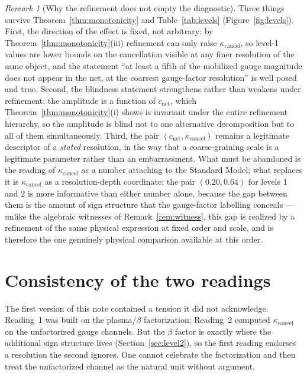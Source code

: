 \documentclass[11pt]{article}
\theoremstyle{definition}
\theoremstyle{remark}
\newtheorem{remark}[theorem]{Remark}
\newcommand{\net}{c_{\mathrm{net}}}
\newcommand{\kcancel}{\kappa_{\mathrm{cancel}}}
\begin{document}
\begin{remark}[Why the refinement does not empty the diagnostic]
\label{rem:survives}
Three things survive Theorem~\ref{thm:monotonicity} and Table~\ref{tab:levels}
(Figure~\ref{fig:levels}). First, the
direction of the effect is fixed, not arbitrary: by Theorem~\ref{thm:monotonicity}(iii) refinement
can only raise $\kcancel$, so level-1 values are lower bounds on the cancellation visible at any
finer resolution of the same object, and the statement ``at least a fifth of the mobilized gauge
magnitude does not appear in the net, at the coarsest gauge-factor resolution'' is well posed and
true. Second, the blindness statement strengthens rather than weakens under refinement: the
amplitude is a function of $\net$, which Theorem~\ref{thm:monotonicity}(i) shows is invariant under
the entire refinement hierarchy, so the amplitude is blind not to one alternative decomposition but
to all of them simultaneously. Third, the pair $(\net, \kcancel)$ remains a legitimate descriptor
of a \emph{stated} resolution, in the way that a coarse-graining scale is a legitimate parameter
rather than an embarrassment. What must be abandoned is the reading of $\kcancel$ as a number
attaching to the Standard Model; what replaces it is $\kcancel$ as a resolution-depth coordinate:
the pair $(0.20, 0.64)$ for levels 1 and 2 is more informative than either number alone, because the
gap between them is the amount of sign structure that the gauge-factor labelling conceals ---
unlike the algebraic witnesses of Remark~\ref{rem:witness}, this gap is realized by a refinement of
the same physical expression at fixed order and scale, and is therefore the one genuinely physical
comparison available at this order.
\end{remark}

\section{Consistency of the two readings}
\label{sec:consistency}

The first version of this note contained a tension it did not acknowledge. Reading~1 was built on
the plasma/$\beta$ factorization; Reading~2 computed $\kcancel$ on the unfactorized gauge channels.
But the $\beta$ factor is exactly where the additional sign structure lives
(Section~\ref{sec:level2}), so the first reading endorses a resolution the second ignores. One
cannot celebrate the factorization and then treat the unfactorized channel as the natural unit
without argument.
\end{document}

